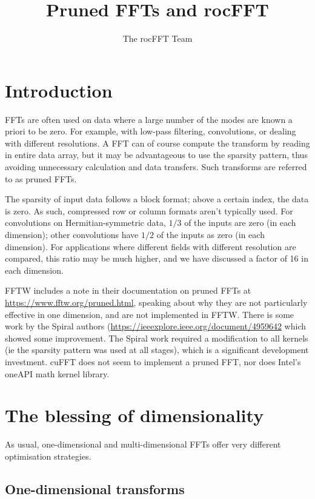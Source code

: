 \documentclass[12pt]{article}
\title{Pruned FFTs and rocFFT}
\author{The rocFFT Team}
\renewcommand{\(}{\left(}
\renewcommand{\)}{\right)}
\begin{document}
\maketitle

\section{Introduction}

FFTs are often used on data where a large number of the modes are
known a priori to be zero.  For example, with low-pass filtering,
convolutions, or dealing with different resolutions.  A FFT can of
course compute the transform by reading in entire data array, but it
may be advantageous to use the sparsity pattern, thus avoiding
unnecessary calculation and data transfers. Such transforms are
referred to as pruned FFTs.

The sparsity of input data follows a block format; above a certain
index, the data is zero.  As such, compressed row or column formats
aren't typically used.  For convolutions on Hermitian-symmetric data,
$1/3$ of the inputs are zero (in each dimension); other convolutions
have $1/2$ of the inputs as zero (in each dimension).  For
applications where different fields with different resolution are
compared, this ratio may be much higher, and we have discussed a
factor of 16 in each dimension.

FFTW includes a note in their documentation on pruned FFTs at
\url{https://www.fftw.org/pruned.html}, speaking about why they are
not particularly effective in one dimension, and are not implemented
in FFTW.  There is some work by the Spiral authors
(\url{https://ieeexplore.ieee.org/document/4959642} which showed some
improvement.  The Spiral work required a modification to all kernels
(ie the sparsity pattern was used at all stages), which is a
significant development investment. cuFFT does not seem to implement a
pruned FFT, nor does Intel's oneAPI math kernel library.

\section{The blessing of dimensionality}

As usual, one-dimensional and multi-dimensional FFTs offer very
different optimisation strategies.

\subsection{One-dimensional transforms}
\end{document}
